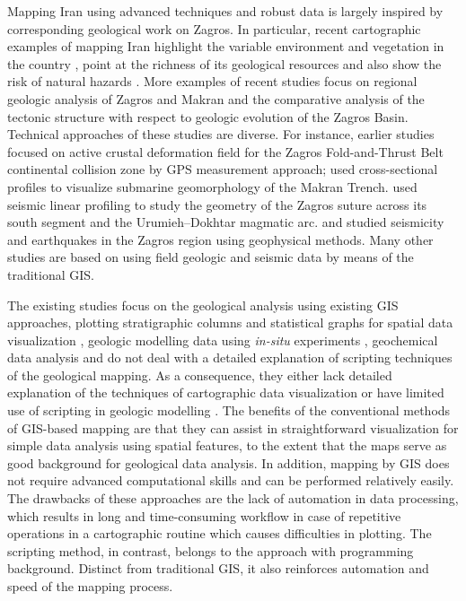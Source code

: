 \documentclass[12pt,a4paper,oneside]{article}
\def \newpar{\vspace{6pt}}
\begin{document}
\newpar Mapping Iran using advanced techniques and robust data is largely inspired by corresponding geological work on Zagros. In particular, recent cartographic examples of mapping Iran highlight the variable environment and vegetation in the country \citep{ESKANDARI2022101727,TOOSI2022101733}, point at the richness of its geological resources \citep{GARAJEH2022473} and also show the risk of natural hazards \citep{MOSTAFAMOUSAVI2022128072,MAFIGHOLAMI2022131841}. More examples of recent studies focus on regional geologic analysis of Zagros and Makran and the comparative analysis of the tectonic structure with respect to geologic evolution of the Zagros Basin. Technical approaches of these studies are diverse. For instance, earlier studies \citep{Palano,Bayer,Masson} focused on active crustal deformation field for the Zagros Fold-and-Thrust Belt continental collision zone by GPS measurement approach; \cite{Lemenkova2020a} used cross-sectional profiles to visualize submarine geomorphology of the Makran Trench. \cite{Motaghi} used seismic linear profiling to study the geometry of the Zagros suture across its south segment and the Urumieh–Dokhtar magmatic arc. \cite{Adams} and \cite{Massonetal2005} studied seismicity and earthquakes in the Zagros region using geophysical methods. Many other studies are based on using field geologic and seismic data by means of the traditional GIS.

\newpar The existing studies focus on the geological analysis using existing GIS approaches, plotting stratigraphic columns and statistical graphs for spatial data visualization \citep{Mouthereau,Koshnaw}, geologic modelling data using \emph{in-situ} experiments \cite{HEIDARI2021104561,SOLEIMANI2016138,Lindh202222,HOSSEINI2021104452}, geochemical data analysis \cite{MOKHTARI2021125774,AFZAL2017278,Lindh202208} and do not deal with a detailed explanation of scripting techniques of the geological mapping. As a consequence, they either lack detailed explanation of the techniques of cartographic data visualization \citep{Tavani} or have limited use of scripting in geologic modelling \citep{Lemenkov2021}. The benefits of the conventional methods of GIS-based mapping are that they can assist in straightforward visualization for simple data analysis using spatial features, to the extent that the maps serve as good background for geological data analysis. In addition, mapping by GIS does not require advanced computational skills and can be performed relatively easily. The drawbacks of these approaches are the lack of automation in data processing, which results in long and time-consuming workflow in case of repetitive operations in a cartographic routine which causes difficulties in plotting. The scripting method, in contrast, belongs to the approach with programming background. Distinct from traditional GIS, it also reinforces automation and speed of the mapping process.
\end{document}
